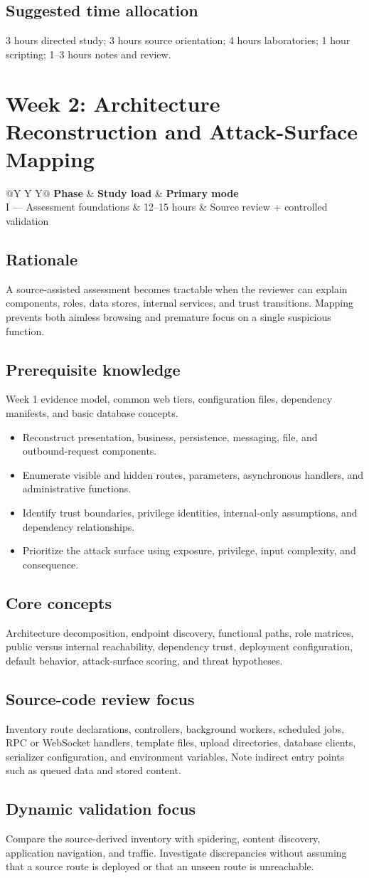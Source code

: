 \documentclass[11pt]{article}
\makeatletter
\newcommand{\weekheader}[4]{%
  \clearpage
  \section{Week #1: #2}
  \begin{tcolorbox}[colback=Navy,colframe=Navy,coltext=white]
    \begin{tabularx}{\linewidth}{@{}Y Y Y@{}}
      \textbf{Phase} & \textbf{Study load} & \textbf{Primary mode}\\
      #3 & #4 hours & Source review + controlled validation
    \end{tabularx}
  \end{tcolorbox}
}
\newcommand{\weekfield}[2]{%
  \Needspace{5\baselineskip}
  \subsection*{#1}
  #2
}
\makeatother
\begin{document}
\weekfield{Suggested time allocation}{3 hours directed study; 3 hours source
orientation; 4 hours laboratories; 1 hour scripting; 1--3 hours notes and review.}

\weekheader{2}{Architecture Reconstruction and Attack-Surface Mapping}{I --- Assessment foundations}{12--15}

\weekfield{Rationale}{A source-assisted assessment becomes tractable when the
reviewer can explain components, roles, data stores, internal services, and trust
transitions. Mapping prevents both aimless browsing and premature focus on a
single suspicious function.}

\weekfield{Prerequisite knowledge}{Week 1 evidence model, common web tiers,
configuration files, dependency manifests, and basic database concepts.}

\begin{objectivebox}
\begin{itemize}
  \item Reconstruct presentation, business, persistence, messaging, file, and outbound-request components.
  \item Enumerate visible and hidden routes, parameters, asynchronous handlers, and administrative functions.
  \item Identify trust boundaries, privilege identities, internal-only assumptions, and dependency relationships.
  \item Prioritize the attack surface using exposure, privilege, input complexity, and consequence.
\end{itemize}
\end{objectivebox}

\weekfield{Core concepts}{Architecture decomposition, endpoint discovery,
functional paths, role matrices, public versus internal reachability, dependency
trust, deployment configuration, default behavior, attack-surface scoring, and
threat hypotheses.}

\weekfield{Source-code review focus}{Inventory route declarations, controllers,
background workers, scheduled jobs, RPC or WebSocket handlers, template files,
upload directories, database clients, serializer configuration, and environment
variables. Note indirect entry points such as queued data and stored content.}

\weekfield{Dynamic validation focus}{Compare the source-derived inventory with
spidering, content discovery, application navigation, and traffic. Investigate
discrepancies without assuming that a source route is deployed or that an unseen
route is unreachable.}
\end{document}
